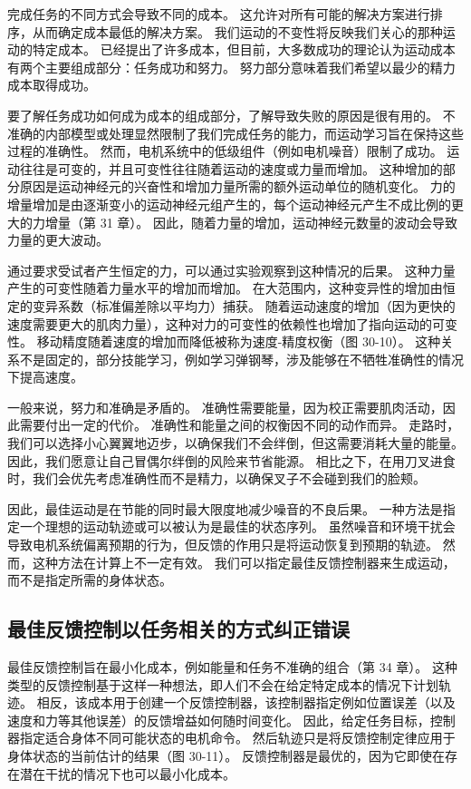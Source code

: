 完成任务的不同方式会导致不同的成本。 这允许对所有可能的解决方案进行排序，从而确定成本最低的解决方案。 我们运动的不变性将反映我们关心的那种运动的特定成本。 已经提出了许多成本，但目前，大多数成功的理论认为运动成本有两个主要组成部分：任务成功和努力。 努力部分意味着我们希望以最少的精力成本取得成功。

要了解任务成功如何成为成本的组成部分，了解导致失败的原因是很有用的。 不准确的内部模型或处理显然限制了我们完成任务的能力，而运动学习旨在保持这些过程的准确性。 然而，电机系统中的低级组件（例如电机噪音）限制了成功。 运动往往是可变的，并且可变性往往随着运动的速度或力量而增加。 这种增加的部分原因是运动神经元的兴奋性和增加力量所需的额外运动单位的随机变化。 力的增量增加是由逐渐变小的运动神经元组产生的，每个运动神经元产生不成比例的更大的力增量（第 31 章）。 因此，随着力量的增加，运动神经元数量的波动会导致力量的更大波动。


通过要求受试者产生恒定的力，可以通过实验观察到这种情况的后果。 这种力量产生的可变性随着力量水平的增加而增加。 在大范围内，这种变异性的增加由恒定的变异系数（标准偏差除以平均力）捕获。 随着运动速度的增加（因为更快的速度需要更大的肌肉力量），这种对力的可变性的依赖性也增加了指向运动的可变性。 移动精度随着速度的增加而降低被称为速度-精度权衡（图 30-10）。 这种关系不是固定的，部分技能学习，例如学习弹钢琴，涉及能够在不牺牲准确性的情况下提高速度。

一般来说，努力和准确是矛盾的。 准确性需要能量，因为校正需要肌肉活动，因此需要付出一定的代价。 准确性和能量之间的权衡因不同的动作而异。 走路时，我们可以选择小心翼翼地迈步，以确保我们不会绊倒，但这需要消耗大量的能量。 因此，我们愿意让自己冒偶尔绊倒的风险来节省能源。 相比之下，在用刀叉进食时，我们会优先考虑准确性而不是精力，以确保叉子不会碰到我们的脸颊。

因此，最佳运动是在节能的同时最大限度地减少噪音的不良后果。 一种方法是指定一个理想的运动轨迹或可以被认为是最佳的状态序列。 虽然噪音和环境干扰会导致电机系统偏离预期的行为，但反馈的作用只是将运动恢复到预期的轨迹。 然而，这种方法在计算上不一定有效。 我们可以指定最佳反馈控制器来生成运动，而不是指定所需的身体状态。


\subsection{最佳反馈控制以任务相关的方式纠正错误}

最佳反馈控制旨在最小化成本，例如能量和任务不准确的组合（第 34 章）。 这种类型的反馈控制基于这样一种想法，即人们不会在给定特定成本的情况下计划轨迹。 相反，该成本用于创建一个反馈控制器，该控制器指定例如位置误差（以及速度和力等其他误差）的反馈增益如何随时间变化。 因此，给定任务目标，控制器指定适合身体不同可能状态的电机命令。 然后轨迹只是将反馈控制定律应用于身体状态的当前估计的结果（图 30-11）。 反馈控制器是最优的，因为它即使在存在潜在干扰的情况下也可以最小化成本。

